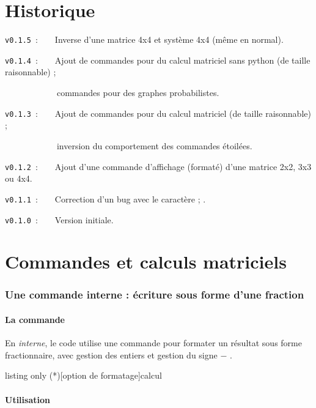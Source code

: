 \documentclass[french,a4paper,11pt]{article}
\begin{document}
\part{Historique}

\verb|v0.1.5|~:~~~~Inverse d'une matrice 4x4 et système 4x4 (même en normal).

\verb|v0.1.4|~:~~~~Ajout de commandes pour du calcul matriciel sans python (de taille raisonnable) ;

\verb|      |~~~~~~commandes pour des graphes probabilistes.

\verb|v0.1.3|~:~~~~Ajout de commandes pour du calcul matriciel (de taille raisonnable) ;

\verb|      |~~~~~~inversion du comportement des commandes étoilées.

\verb|v0.1.2|~:~~~~Ajout d'une commande d'affichage (formaté) d'une matrice 2x2, 3x3 ou 4x4.

\verb|v0.1.1|~:~~~~Correction d'un bug avec le caractère \og ; \fg.

\verb|v0.1.0|~:~~~~Version initiale.

\pagebreak

\part{Commandes et calculs matriciels}

\section{Une commande interne : écriture sous forme d'une fraction}

\subsection{La commande}

\begin{cautionblock}
En \textit{interne}, le code utilise une commande pour formater un résultat sous forme fractionnaire, avec gestion des entiers et gestion du signe \og $-$ \fg.
\end{cautionblock}

\begin{PresentationCode}{listing only}
\ConvVersFrac(*)[option de formatage]{calcul}
\end{PresentationCode}

\subsection{Utilisation}
\end{document}
